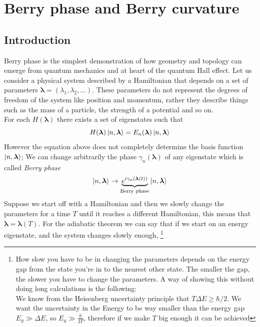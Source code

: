 \chapter{Berry phase and Berry curvature}
\section{Introduction}
    Berry phase is the simplest demonstration of how geometry and topology can emerge from quantum mechanics and at heart of the quantum Hall effect.\newline
    Let us consider a physical system described by a Hamiltonian that depends on a set of parameters $\boldsymbol \lambda=(\lambda_1,\lambda_2,\dots)$. These parameters do not represent the degrees of freedom of the system like position and momentum, rather they describe things such as the mass of a particle, the strength of a potential and so on.\\ For each $H(\boldsymbol \lambda)$ there exists a set of eigenstates such that 
    \begin{equation}
        H(\boldsymbol \lambda)\ket{n,\boldsymbol \lambda}=E_n(\boldsymbol \lambda)\ket{n,\boldsymbol \lambda}
    \end{equation}
    However the equation above does not completely determine the basis function $\ket{n,\boldsymbol \lambda}$; We can change arbitrarily the phase $\gamma_n(\boldsymbol \lambda)$ of any eigenstate which is called \textit{Berry phase}
    \begin{equation}
        \label{eq:berryphase}
        \ket{n,\boldsymbol \lambda}\to \underbrace{e^{i\gamma_n(\boldsymbol \lambda (t))}}_{\textrm{Berry phase}} \ket{n,\boldsymbol \lambda}  
    \end{equation}
    Suppose we start off with a Hamiltonian and then we slowly change the parameters for a time $T$ until it reaches a different Hamiltonian, this means that $\boldsymbol \lambda=\boldsymbol \lambda(T)$. For the adiabatic theorem we can say that if we start on an energy eigenstate, and the system changes slowly enough,
    \footnote{How slow you have to be in changing the parameters depends on the energy gap from the state you're in to the nearest other state. The smaller the gap, the slower you have to change the parameters. A way of showing this without doing long calculations is the following: \\ We know from the Heisenberg uncertainty principle that $T \Delta E \ge \hbar/2$. We want the uncertainty in the Energy to be way smaller than the energy gap $E_g \gg\Delta E$, so $E_g \gg \frac{\hbar}{2T}$, therefore if we make $T$ big enough it can be achieved}
